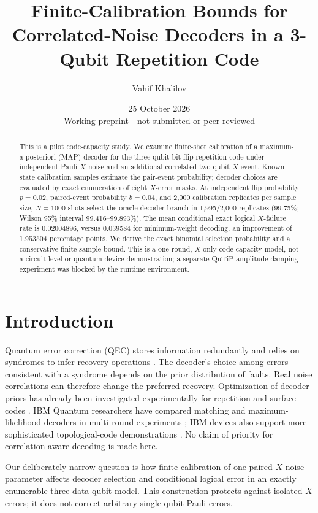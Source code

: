 \documentclass[11pt,a4paper]{article}
\title{Finite-Calibration Bounds for Correlated-Noise Decoders in a 3-Qubit Repetition Code}
\author{Vahif Khalilov}
\date{25 October 2026\\\small Working preprint---not submitted or peer reviewed}
\begin{document}
\maketitle
\begin{abstract}
This is a pilot code-capacity study. We examine finite-shot calibration of a maximum-a-posteriori (MAP) decoder for the three-qubit bit-flip repetition code under independent Pauli-$X$ noise and an additional correlated two-qubit $X$ event. Known-state calibration samples estimate the pair-event probability; decoder choices are evaluated by exact enumeration of eight $X$-error masks. At independent flip probability $p=0.02$, paired-event probability $b=0.04$, and 2,000 calibration replicates per sample size, $N=1000$ shots select the oracle decoder branch in 1,995/2,000 replicates (99.75\%; Wilson 95\% interval 99.416--99.893\%). The mean conditional exact logical $X$-failure rate is 0.02004896, versus 0.039584 for minimum-weight decoding, an improvement of 1.953504 percentage points. We derive the exact binomial selection probability and a conservative finite-sample bound. This is a one-round, $X$-only code-capacity model, not a circuit-level or quantum-device demonstration; a separate QuTiP amplitude-damping experiment was blocked by the runtime environment.
\end{abstract}

\section{Introduction}
Quantum error correction (QEC) stores information redundantly and relies on syndromes to infer recovery operations \cite{gottesman1997,ibmrepetition}. The decoder's choice among errors consistent with a syndrome depends on the prior distribution of faults. Real noise correlations can therefore change the preferred recovery. Optimization of decoder priors has already been investigated experimentally for repetition and surface codes \cite{sivak2024}. IBM Quantum researchers have compared matching and maximum-likelihood decoders in multi-round experiments \cite{sundaresan2023}; IBM devices also support more sophisticated topological-code demonstrations \cite{hetenyi2024}. No claim of priority for correlation-aware decoding is made here.

Our deliberately narrow question is how finite calibration of one paired-$X$ noise parameter affects decoder selection and conditional logical error in an exactly enumerable three-data-qubit model. This construction protects against isolated $X$ errors; it does not correct arbitrary single-qubit Pauli errors.
\end{document}
